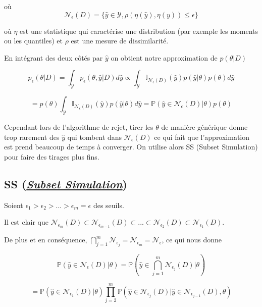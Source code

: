 \documentclass[french,12pt]{article}
\begin{document}
où $$\mathcal{N}_{\epsilon}(D) = \{\hat{y} \in \mathcal{Y}, \rho(\eta(\hat{y}), \eta(y)) \leq \epsilon\}$$


où $\eta$ est une statistique qui caractérise une distribution
(par exemple les moments ou les quantiles) et $\rho$ est une mesure de dissimilarité.

En intégrant des deux côtés par $\hat{y}$ on obtient notre approximation de $p(\theta | D)$

$$p_{\epsilon}( \theta | D) = \int_{\mathcal{Y}} p_{\epsilon}( \theta , \hat{y}| D) d \hat{y} \propto \int_{\mathcal{Y}} \mathbb{I}_{\mathcal{N}_\epsilon (D)} (\hat{y}) p( \hat{y}| \theta) p( \theta) d \hat{y}$$

$$ = p( \theta) \int_{\mathcal{Y}} \mathbb{I}_{\mathcal{N}_\epsilon (D)} (\hat{y})  p( \hat{y}| \theta) d \hat{y} = \mathbb{P} (\hat{y} \in \mathcal{N}_{\epsilon} (D)| \theta) p( \theta)$$

Cependant lors de l'algorithme de rejet, tirer les $\theta$ de manière générique donne trop rarement des $\hat{y}$ qui tombent dans $\mathcal{N}_{\epsilon} (D)$
ce qui fait que l'approximation est prend beaucoup de temps à converger. On utilise alors SS (Subset Simulation)
pour faire des tirages plus fins.

\subsection{SS (\href{https://en.wikipedia.org/wiki/Subset_simulation}{\textit{Subset Simulation}})}

Soient $\epsilon_1 > \epsilon_2 > ... >\epsilon_m = \epsilon$ des seuils.

Il est clair que $\mathcal{N}_{\epsilon_m} (D)\subset \mathcal{N}_{\epsilon_{m - 1}} (D)
    \subset ... \subset \mathcal{N}_{\epsilon_{2}} (D) \subset \mathcal{N}_{\epsilon_{1}} (D)$.

De plus et en conséquence, $\bigcap_{j = 1}^m \mathcal{N}_{\epsilon_j} = \mathcal{N}_{\epsilon_m} = \mathcal{N}_{\epsilon} $, ce qui nous donne

$$ \mathbb{P} \left(\hat{y} \in \mathcal{N}_{\epsilon} (D)| \theta \right) = \mathbb{P} \left(\hat{y} \in \bigcap_{j = 1}^m \mathcal{N}_{\epsilon_j} (D)| \theta\right)$$

$$= \mathbb{P} \left(\hat{y} \in \mathcal{N}_{\epsilon_1} (D)| \theta\right)
    \prod_{j = 2}^{m} \mathbb{P} \left(\hat{y} \in \mathcal{N}_{\epsilon_j} (D)|\hat{y} \in \mathcal{N}_{\epsilon_{j - 1}} (D), \theta\right)$$
\end{document}
